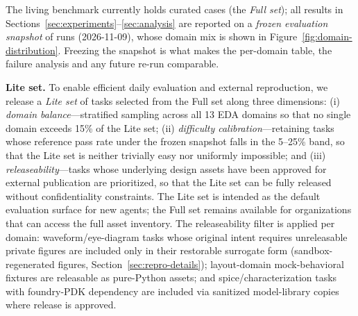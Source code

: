 The living benchmark currently holds \Ntasks{} curated cases (the \emph{Full set}); all results in
Sections~\ref{sec:experiments}--\ref{sec:analysis} are reported on a \emph{frozen
evaluation snapshot} of \Neval{} runs (2026-11-09), whose domain mix is shown in
Figure~\ref{fig:domain-distribution}. Freezing the snapshot is what makes the
per-domain table, the failure analysis and any future re-run comparable.

\textbf{Lite set.} To enable efficient daily evaluation and external reproduction,
we release a \emph{Lite set} of \LiteSet{} tasks selected from the Full set along
three dimensions: (i) \emph{domain balance}---stratified sampling across all 13
EDA domains so that no single domain exceeds 15\% of the Lite set; (ii)
\emph{difficulty calibration}---retaining tasks whose reference pass rate under
the frozen snapshot falls in the 5--25\% band, so that the Lite set is neither
trivially easy nor uniformly impossible; and (iii) \emph{releaseability}---tasks
whose underlying design assets have been approved for external publication are
prioritized, so that the Lite set can be fully released without confidentiality
constraints. The Lite set is intended as the default evaluation surface for new
agents; the Full set remains available for organizations that can access the
full asset inventory. The releaseability filter is applied per domain: waveform/eye-diagram tasks whose original intent requires unreleasable private figures are included only in their restorable surrogate form (sandbox-regenerated figures, Section~\ref{sec:repro-details}); layout-domain mock-behavioral fixtures are releasable as pure-Python assets; and spice/characterization tasks with foundry-PDK dependency are included via sanitized model-library copies where release is approved.


